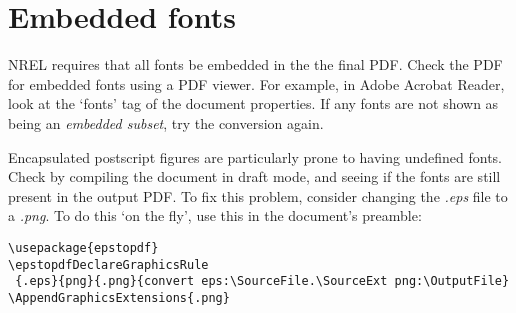 \section{Embedded fonts}
NREL requires that all fonts be embedded in the the final PDF. Check the PDF for embedded fonts using a PDF viewer. For example, in Adobe Acrobat Reader, look at the `fonts' tag of the document properties. If any fonts are not shown as being an \emph{embedded subset}, try the conversion again. 

Encapsulated postscript figures are particularly prone to having undefined fonts. Check by compiling the document in draft mode, and seeing if the fonts are still present in the output PDF. To fix this problem, consider changing the \emph{.eps} file to a \emph{.png}. To do this `on the fly', use this in the document's preamble:

\begin{lstlisting}
\usepackage{epstopdf}
\epstopdfDeclareGraphicsRule
 {.eps}{png}{.png}{convert eps:\SourceFile.\SourceExt png:\OutputFile}
\AppendGraphicsExtensions{.png}
\end{lstlisting}